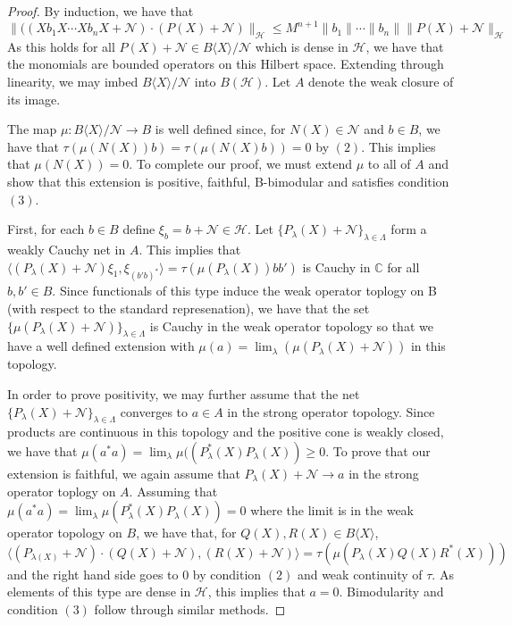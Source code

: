 \documentclass[11pt]{amsart}
\begin{document}
\begin{proof}
By induction, we have that $$\| ( (Xb_{1}X \cdots Xb_{n}X + \mathcal{N}) \cdot (P(X) + \mathcal{N}) \|_{\mathcal{H}} \leq M^{n+1} \|b_{1} \| \cdots \|b_{n} \| \|P(X) + \mathcal{N} \|_{\mathcal{H}}
$$  As this holds for all $P(X) + \mathcal{N} \in B\langle X \rangle / \mathcal{N}$ which is dense in $\mathcal{H}$, we have that the monomials are bounded operators
on this Hilbert space.  Extending through linearity, we may imbed $B\langle X \rangle / \mathcal{N}$ into $B(\mathcal{H})$.  Let $A$ denote the weak
closure of its image.

The map $\mu: B\langle X \rangle / \mathcal{N} \rightarrow B$ is well defined since, for $N(X) \in \mathcal{N}$ and $b \in B$,
we have that $\tau(\mu(N(X))b) = \tau(\mu(N(X)b)) = 0$ by $(2)$.   This implies that $\mu(N(X)) = 0$.
To complete our proof, we must extend $\mu$ to all of $A$ and show that this extension is positive, faithful, B-bimodular and satisfies condition $(3)$.

First, for each $b \in B$ define $\xi_{b} = b + \mathcal{N} \in \mathcal{H}$.  Let $\{P_{\lambda}(X) + \mathcal{N} \}_{\lambda \in \Lambda}$ form a weakly Cauchy net in $A$.
  This implies that $\langle (P_{\lambda}(X) + \mathcal{N}) \xi_{1} , \xi_{(b'b)^{\ast}}\rangle = \tau(\mu(P_{\lambda}(X))bb' )$ is 
Cauchy in $\mathbb{C}$ for all $b,b' \in B$.  Since functionals of this type induce the weak operator toplogy on B (with respect to the standard represenation),
we have that the set $\{\mu(P_{\lambda}(X) + \mathcal{N}) \}_{\lambda \in \Lambda}$ is Cauchy in the weak operator topology so that we have a well
defined extension with $\mu(a) = \lim_{\lambda}(\mu(P_{\lambda}(X) + \mathcal{N}))$ in this topology.

In order to prove positivity, we may further assume that the net $\{P_{\lambda}(X) + \mathcal{N}\}_{\lambda \in \Lambda}$ converges to $a \in A$ in the
strong operator topology.  Since products are continuous in this topology and the positive cone is weakly closed, we have that
$\mu(a^{\ast}a) = \lim_{\lambda}\mu((P^{\ast}_{\lambda}(X)P_{\lambda}(X)) \geq 0$.  To prove that our extension is faithful, we again assume that $P_{\lambda}(X) + \mathcal{N} \rightarrow a$
in the strong operator toplogy on $A$.  Assuming that $\mu(a^{\ast}a) = \lim_{\lambda}\mu(P^{\ast}_{\lambda}(X)P_{\lambda}(X)) = 0$ where the limit is in the weak operator
topology on $B$, we have that, for $Q(X), R(X) \in B\langle X \rangle$,
$$ \langle (P_{\lambda(X)} + \mathcal{N})\cdot (Q(X) + \mathcal{N}),(R(X) + \mathcal{N}) \rangle = \tau(\mu(P_{\lambda}(X)Q(X)R^{\ast}(X)))$$
and the right hand side goes to $0$ by condition $(2)$ and weak continuity of $\tau$.
As elements of this type are dense in $\mathcal{H}$, this implies that $a = 0$.  Bimodularity and condition $(3)$ follow through similar methods.




\end{proof}
\end{document}
